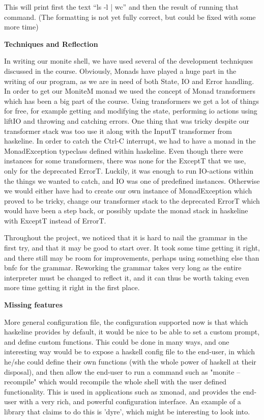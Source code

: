 \documentclass[11pt,a4paper]{article}
\begin{document}
This will print first the text ``ls -l | wc'' and then the result of running
that command. (The formatting is not yet fully correct, but could be fixed with
some more time)

\textbf{Techniques and Reflection}

In writing our monite shell, we have used several of the development techniques
discussed in the course. Obviously, Monads have played a huge part in the
writing of our program, as we are in need of both State, IO and Error handling.
In order to get our MoniteM monad we used the concept of Monad transformers
which has been a big part of the course. Using transformers we get a lot of
things for free, for example getting and modifying the state, performing io
actions using liftIO and throwing and catching errors. One thing that was
tricky despite our transformer stack was too use it along with the InputT
transformer from haskeline. In order to catch the Ctrl-C interrupt, we had to
have a monad in the MonadException typeclass defined within haskeline. Even
though there were instances for some transformers, there was none for the
ExceptT that we use, only for the deprecated ErrorT. Luckily, it was enough to
run IO-actions within the things we wanted to catch, and IO was one of
predefined instances. Otherwise we would either have had to create our own
instance of MonadException which proved to be tricky, change our transformer
stack to the deprecated ErrorT which would have been a step back, or possibly
update the monad stack in haskeline with ExceptT instead of ErrorT.

Throughout the project, we noticed that it is hard to nail the grammar in the
first try, and that it may be good to start over. It took some time getting it
right, and there still may be room for improvements, perhaps using something
else than bnfc for the grammar. Reworking the grammar takes very long as the
entire interpreter must be changed to reflect it, and it can thus be worth
taking even more time getting it right in the first place.

\textbf{Missing features}

More general configuration file, the configuration supported now is that which
haskeline provides by default, it would be nice to be able to set a custom
prompt, and define custom functions. This could be done in many ways, and one
interesting way would be to expose a haskell config file to the end-user, in
which he/she could define their own functions (with the whole power of haskell
at their disposal), and then allow the end-user to run a command such as "monite
--recompile" which would recompile the whole shell with the user defined
functionality. This is used in applications such as xmonad, and provides the
end-user with a very rich, and powerful configuration interface. An example of a
library that claims to do this is 'dyre', which might be interesting to look
into.
\end{document}
